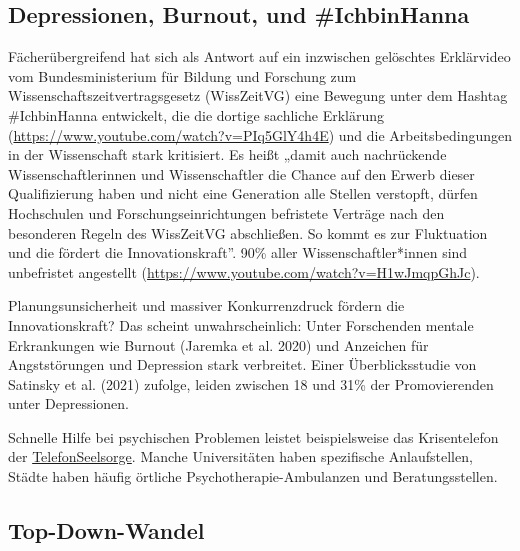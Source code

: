 \documentclass[
  letterpaper,
  DIV=11,
  numbers=noendperiod]{scrreprt}
\begin{document}
\subsection{Depressionen, Burnout, und
\#IchbinHanna}\label{depressionen-burnout-und-ichbinhanna}

Fächerübergreifend hat sich als Antwort auf ein inzwischen gelöschtes
Erklärvideo vom Bundesministerium für Bildung und Forschung zum
Wissenschaftszeitvertragsgesetz (WissZeitVG) eine Bewegung unter dem
Hashtag \#IchbinHanna entwickelt, die die dortige sachliche Erklärung
(\url{https://www.youtube.com/watch?v=PIq5GlY4h4E}) und die
Arbeitsbedingungen in der Wissenschaft stark kritisiert. Es heißt „damit
auch nachrückende Wissenschaftlerinnen und Wissenschaftler die Chance
auf den Erwerb dieser Qualifizierung haben und nicht eine Generation
alle Stellen verstopft, dürfen Hochschulen und Forschungseinrichtungen
befristete Verträge nach den besonderen Regeln des WissZeitVG
abschließen. So kommt es zur Fluktuation und die fördert die
Innovationskraft''. 90\% aller Wissenschaftler*innen sind unbefristet
angestellt (\url{https://www.youtube.com/watch?v=H1wJmqpGhJc}).

Planungsunsicherheit und massiver Konkurrenzdruck fördern die
Innovationskraft? Das scheint unwahrscheinlich: Unter Forschenden
mentale Erkrankungen wie Burnout (Jaremka et al. 2020) und Anzeichen für
Angststörungen und Depression stark verbreitet. Einer Überblicksstudie
von Satinsky et al. (2021) zufolge, leiden zwischen 18 und 31\% der
Promovierenden unter Depressionen.

\begin{tcolorbox}[enhanced jigsaw, title=\textcolor{quarto-callout-caution-color}{\faFire}\hspace{0.5em}{Wer hilft?}, colbacktitle=quarto-callout-caution-color!10!white, rightrule=.15mm, titlerule=0mm, left=2mm, bottomrule=.15mm, arc=.35mm, leftrule=.75mm, toprule=.15mm, opacityback=0, breakable, bottomtitle=1mm, colframe=quarto-callout-caution-color-frame, toptitle=1mm, opacitybacktitle=0.6, coltitle=black, colback=white]

Schnelle Hilfe bei psychischen Problemen leistet beispielsweise das
Krisentelefon der
\href{https://www.telefonseelsorge.de}{TelefonSeelsorge}. Manche
Universitäten haben spezifische Anlaufstellen, Städte haben häufig
örtliche Psychotherapie-Ambulanzen und Beratungsstellen.

\end{tcolorbox}

\subsection{Top-Down-Wandel}\label{top-down-wandel}
\end{document}
